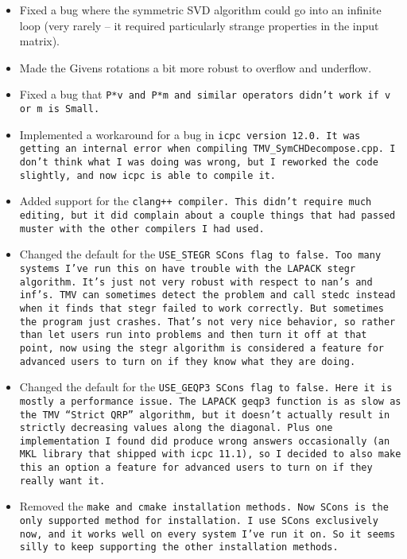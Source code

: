 \begin{itemize}
\item
Fixed a bug where the symmetric SVD algorithm could go into an infinite loop (very rarely -- it required particularly strange properties in the input matrix).
 
\item
Made the Givens rotations a bit more robust to overflow and underflow.

\item
Fixed a bug that \tt{P*v} and \tt{P*m} and similar operators didn't work if 
\tt{v} or \tt{m} is \tt{Small}.

\item
Implemented a workaround for a bug in \tt{icpc} version 12.0.
It was getting an internal
error when compiling \tt{TMV\_SymCHDecompose.cpp}.  I don't think what I was 
doing was wrong, but I reworked the code slightly, and now \tt{icpc} is able
to compile it.

\item 
Added support for the \tt{clang++} compiler.  This didn't require much editing, but it did complain about a couple things that had passed muster with the other compilers I had used.

\item
Changed the default for the \tt{USE\_STEGR} SCons flag to \tt{false}.  Too many
systems I've run this on have trouble with the LAPACK \tt{stegr} algorithm.
It's just not very robust with respect to \tt{nan}'s and \tt{inf}'s.  TMV can
sometimes detect the problem and call \tt{stedc} instead when it finds 
that \tt{stegr} failed to work correctly.  But sometimes the program just
crashes.  That's not very nice behavior, so rather than let users run 
into problems and then turn it off at that point, now
using the \tt{stegr} algorithm is considered a feature for advanced users to turn on if 
they know what they are doing.

\item
Changed the default for the \tt{USE\_GEQP3} SCons flag to \tt{false}.
Here it is mostly a performance issue.  The LAPACK \tt{geqp3} function is as slow as the TMV ``Strict QRP'' algorithm, but it doesn't actually result in strictly decreasing values along the diagonal.  Plus one implementation I found did produce wrong answers occasionally (an MKL library that shipped with icpc 11.1), so I decided to also make this an option a feature for advanced users to turn on if they really want it.

\item
Removed the \tt{make} and \tt{cmake} installation methods.  
Now SCons is the 
only supported method for installation.  I use SCons exclusively now, 
and it works well on every system I've run it on.  So it seems silly
to keep supporting the other installation methods.  


\end{itemize}
